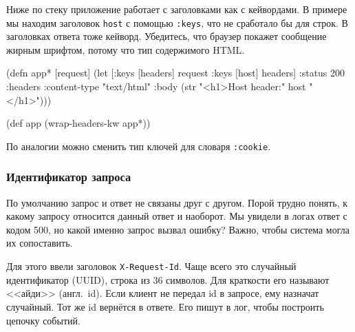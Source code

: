 \fi

Ниже по стеку приложение работает с заголовками как с кейвордами. В примере мы
находим заголовок \verb|host| с помощью \verb|:keys|, что не сработало бы
для строк. В заголовках ответа тоже кейворд. Убедитесь, что браузер покажет
сообщение жирным шрифтом, потому что тип содержимого HTML.

\ifx\DEVICETYPE\MOBILE

\begin{english}
  \begin{clojure}
(defn app* [request]
  (let [{:keys [headers]} request
        {:keys [host]} headers]
    {:status 200
     :headers {:content-type "text/html"}
     :body (str "<h1>Host header:" host
                "</h1>")}))

(def app (wrap-headers-kw app*))
  \end{clojure}
\end{english}

\else

\begin{english}
\end{english}

\fi

По аналогии можно сменить тип ключей для словаря \verb|:cookie|.

\subsubsection*{Идентификатор запроса}


По умолчанию запрос и ответ не связаны друг с другом. Порой трудно понять, к
какому запросу относится данный ответ и наоборот. Мы увидели в логах ответ с
кодом 500, но какой именно запрос вызвал ошибку? Важно, чтобы система могла их
сопоставить.

Для этого ввели заголовок \verb|X-Request-Id|. Чаще всего это случайный
идентификатор (UUID), строка из 36 символов. Для краткости его называют <<айди>>
(англ.~id). Если клиент не передал id в запросе, ему назначат случайный. Тот же
id вернётся в ответе. Его пишут в лог, чтобы построить цепочку событий.

